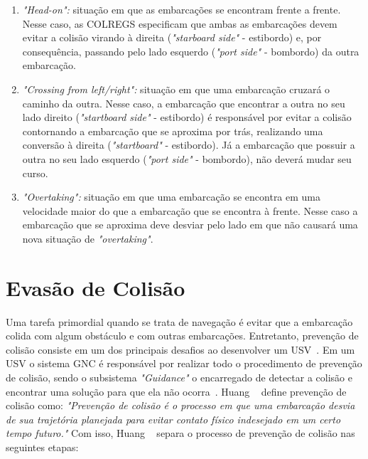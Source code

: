        \begin{enumerate}[label=\alph*]
            \item \textit{"Head-on":} situação em que as embarcações se encontram frente a frente. Nesse caso, as COLREGS especificam que ambas as embarcações devem evitar a colisão virando à direita  (\textit{"starboard side"} - estibordo) e, por consequência, passando pelo lado esquerdo (\textit{"port side"} - bombordo) da outra embarcação.
            
            \item \textit{"Crossing from left/right":} situação em que uma embarcação cruzará o caminho da outra. Nesse caso, a embarcação que encontrar a outra no seu lado direito (\textit{"startboard side"} - estibordo) é responsável por evitar a colisão contornando a embarcação que se aproxima por trás, realizando uma conversão à direita (\textit{"startboard"} - estibordo). Já a embarcação que possuir a outra no seu lado esquerdo (\textit{"port side"} - bombordo), não deverá mudar seu curso.
            
            \item \textit{"Overtaking":} situação em que uma embarcação se encontra em uma velocidade maior do que a embarcação que se encontra à frente. Nesse caso a embarcação que se aproxima deve desviar pelo lado em que não causará uma nova situação de \textit{"overtaking"}.
        \end{enumerate}
    
    \section{Evasão de Colisão}\label{subchap2:prev_col}
        Uma tarefa primordial quando se trata de navegação é evitar que a embarcação colida com algum obstáculo e com outras embarcações. Entretanto, prevenção de colisão consiste em um dos principais desafios ao desenvolver um USV~\cite{Jurak2020COLREGS}. Em um USV o sistema GNC é responsável por realizar todo o procedimento de prevenção de colisão, sendo o subsistema \textit{"Guidance"} o encarregado de detectar a colisão e encontrar uma solução para que ela não ocorra~\cite{Huang2020Ship}.
        Huang \etal~\cite[p.451]{Huang2020Ship} define prevenção de colisão como: \textit{"Prevenção de colisão é o processo em que uma embarcação desvia de sua trajetória planejada para evitar contato físico indesejado em um certo tempo futuro."} Com isso, Huang \etal~\cite{Huang2020Ship} separa o processo de prevenção de colisão nas seguintes etapas: 
        
